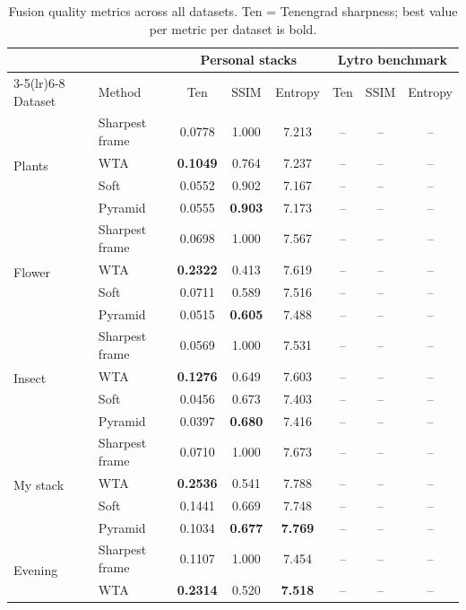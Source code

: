 \documentclass[conference]{IEEEtran}
\begin{document}
\begin{table}[t]
\centering
\caption{Fusion quality metrics across all datasets. Ten = Tenengrad sharpness; best value per metric per dataset is bold.}
\label{tab:fusion_metrics}
\begin{tabular}{llcccccc}
\toprule
 & & \multicolumn{3}{c}{Personal stacks} & \multicolumn{3}{c}{Lytro benchmark} \\
\cmidrule(lr){3-5}\cmidrule(lr){6-8}
Dataset & Method & Ten & SSIM & Entropy & Ten & SSIM & Entropy \\
\midrule
\multirow{4}{*}{Plants}
  & Sharpest frame & 0.0778 & 1.000 & 7.213 & -- & -- & -- \\
  & WTA            & \textbf{0.1049} & 0.764 & 7.237 & -- & -- & -- \\
  & Soft           & 0.0552 & 0.902 & 7.167 & -- & -- & -- \\
  & Pyramid        & 0.0555 & \textbf{0.903} & 7.173 & -- & -- & -- \\
\midrule
\multirow{4}{*}{Flower}
  & Sharpest frame & 0.0698 & 1.000 & 7.567 & -- & -- & -- \\
  & WTA            & \textbf{0.2322} & 0.413 & 7.619 & -- & -- & -- \\
  & Soft           & 0.0711 & 0.589 & 7.516 & -- & -- & -- \\
  & Pyramid        & 0.0515 & \textbf{0.605} & 7.488 & -- & -- & -- \\
\midrule
\multirow{4}{*}{Insect}
  & Sharpest frame & 0.0569 & 1.000 & 7.531 & -- & -- & -- \\
  & WTA            & \textbf{0.1276} & 0.649 & 7.603 & -- & -- & -- \\
  & Soft           & 0.0456 & 0.673 & 7.403 & -- & -- & -- \\
  & Pyramid        & 0.0397 & \textbf{0.680} & 7.416 & -- & -- & -- \\
\midrule
\multirow{4}{*}{My stack}
  & Sharpest frame & 0.0710 & 1.000 & 7.673 & -- & -- & -- \\
  & WTA            & \textbf{0.2536} & 0.541 & 7.788 & -- & -- & -- \\
  & Soft           & 0.1441 & 0.669 & 7.748 & -- & -- & -- \\
  & Pyramid        & 0.1034 & \textbf{0.677} & \textbf{7.769} & -- & -- & -- \\
\midrule
\multirow{4}{*}{Evening}
  & Sharpest frame & 0.1107 & 1.000 & 7.454 & -- & -- & -- \\
  & WTA            & \textbf{0.2314} & 0.520 & \textbf{7.518} & -- & -- & -- \\

\end{tabular}
\end{table}
\end{document}
